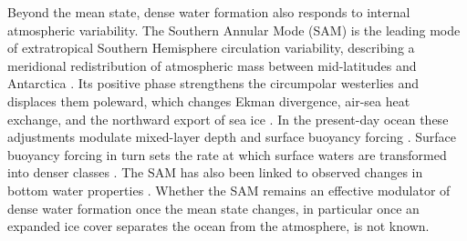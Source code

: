 \documentclass[pdflatex,sn-nature]{sn-jnl}
\begin{document}
Beyond the mean state, dense water formation also responds to internal atmospheric variability. The Southern Annular Mode (SAM) is the leading mode of extratropical Southern Hemisphere circulation variability, describing a meridional redistribution of atmospheric mass between mid-latitudes and Antarctica \cite{Gong1999,Thompson2000,Marshall2003}. Its positive phase strengthens the circumpolar westerlies and displaces them poleward, which changes Ekman divergence, air-sea heat exchange, and the northward export of sea ice \cite{HallVisbeck2002,SenGupta2006}. In the present-day ocean these adjustments modulate mixed-layer depth and surface buoyancy forcing \cite{Sallee2010,SenGupta2006}. Surface buoyancy forcing in turn sets the rate at which surface waters are transformed into denser classes \cite{Cerovecki2013,Abernathey2016}. The SAM has also been linked to observed changes in bottom water properties \cite{Zhou2023,Silvano2020}. Whether the SAM remains an effective modulator of dense water formation once the mean state changes, in particular once an expanded ice cover separates the ocean from the atmosphere, is not known.
\end{document}

